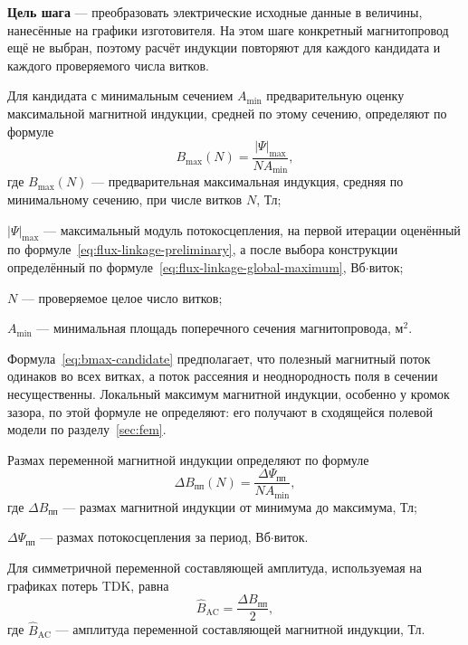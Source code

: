 \documentclass[14pt,a4paper]{extarticle}
\begin{document}
\textbf{Цель шага} --- преобразовать электрические исходные данные в
величины, нанесённые на графики изготовителя. На этом шаге конкретный
магнитопровод ещё не выбран, поэтому расчёт индукции повторяют для
каждого кандидата и каждого проверяемого числа витков.

Для кандидата с минимальным сечением $A_{\min}$ предварительную оценку
максимальной магнитной индукции, средней по этому сечению, определяют по
формуле
\begin{equation}
 B_{\max}(N)=
 \frac{\left|\Psi\right|_{\max}}{N A_{\min}},
 \label{eq:bmax-candidate}
\end{equation}
где $B_{\max}(N)$ --- предварительная максимальная индукция, средняя по
минимальному сечению, при числе витков $N$, Тл;\par\noindent
$\left|\Psi\right|_{\max}$ --- максимальный модуль потокосцепления,
на первой итерации оценённый по формуле~\eqref{eq:flux-linkage-preliminary},
а после выбора конструкции определённый по
формуле~\eqref{eq:flux-linkage-global-maximum},
Вб$\cdot$виток;\par\noindent
$N$ --- проверяемое целое число витков;\par\noindent
$A_{\min}$ --- минимальная площадь поперечного сечения
магнитопровода, м$^2$.

Формула~\eqref{eq:bmax-candidate} предполагает, что полезный магнитный
поток одинаков во всех витках, а поток рассеяния и неоднородность поля в
сечении несущественны. Локальный максимум магнитной индукции, особенно у
кромок зазора, по этой формуле не определяют: его получают в сходящейся
полевой модели по разделу~\ref{sec:fem}.

Размах переменной магнитной индукции определяют по формуле
\begin{equation}
 \Delta B_{\text{пп}}(N)=
 \frac{\Delta\Psi_{\text{пп}}}{N A_{\min}},
 \label{eq:delta-b}
\end{equation}
где $\Delta B_{\text{пп}}$ --- размах магнитной индукции от минимума до
максимума, Тл;\par\noindent
$\Delta\Psi_{\text{пп}}$ --- размах потокосцепления за период,
Вб$\cdot$виток.

Для симметричной переменной составляющей амплитуда, используемая на
графиках потерь TDK, равна
\begin{equation}
 \widehat B_{\text{AC}}=
 \frac{\Delta B_{\text{пп}}}{2},
 \label{eq:bhat-ac}
\end{equation}
где $\widehat B_{\text{AC}}$ --- амплитуда переменной составляющей
магнитной индукции, Тл.
\end{document}

